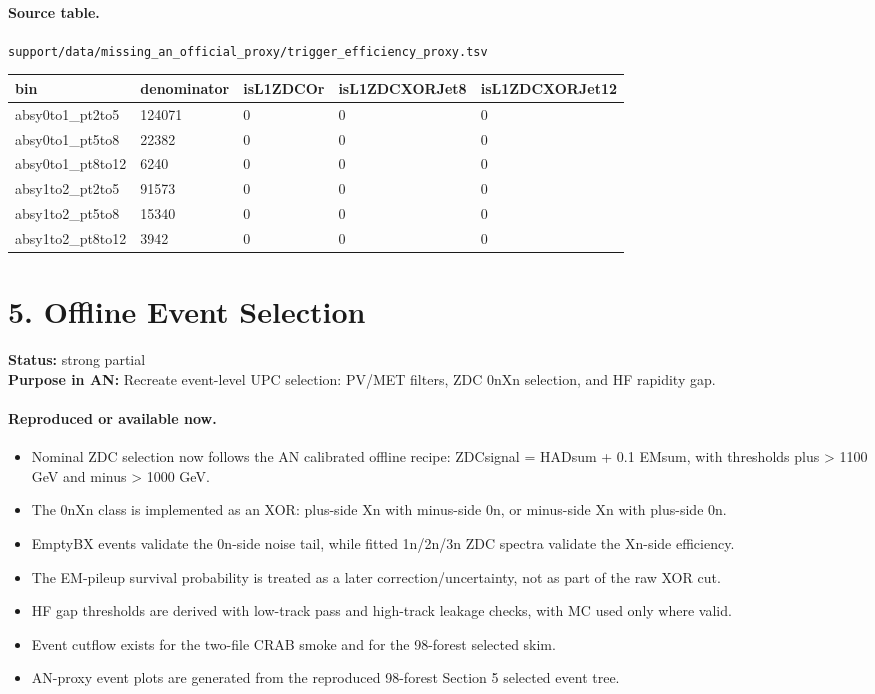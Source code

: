 \documentclass[11pt]{article}
\begin{document}
\paragraph{Source table.} \texttt{support/data/missing\_an\_official\_proxy/trigger\_efficiency\_proxy.tsv}
\begin{center}\scriptsize
\begin{tabular}{|l|l|l|l|l|}
\hline
bin & denominator & isL1ZDCOr & isL1ZDCXORJet8 & isL1ZDCXORJet12 \\ \hline
absy0to1\_pt2to5 & 124071 & 0 & 0 & 0 \\ \hline
absy0to1\_pt5to8 & 22382 & 0 & 0 & 0 \\ \hline
absy0to1\_pt8to12 & 6240 & 0 & 0 & 0 \\ \hline
absy1to2\_pt2to5 & 91573 & 0 & 0 & 0 \\ \hline
absy1to2\_pt5to8 & 15340 & 0 & 0 & 0 \\ \hline
absy1to2\_pt8to12 & 3942 & 0 & 0 & 0 \\ \hline
\end{tabular}
\end{center}
\section*{5. Offline Event Selection}
\textbf{Status:} strong partial\\
\textbf{Purpose in AN:} Recreate event-level UPC selection: PV/MET filters, ZDC 0nXn selection, and HF rapidity gap.
\paragraph{Reproduced or available now.}
\begin{itemize}
\item Nominal ZDC selection now follows the AN calibrated offline recipe: ZDCsignal = HADsum + 0.1 EMsum, with thresholds plus > 1100 GeV and minus > 1000 GeV.
\item The 0nXn class is implemented as an XOR: plus-side Xn with minus-side 0n, or minus-side Xn with plus-side 0n.
\item EmptyBX events validate the 0n-side noise tail, while fitted 1n/2n/3n ZDC spectra validate the Xn-side efficiency.
\item The EM-pileup survival probability is treated as a later correction/uncertainty, not as part of the raw XOR cut.
\item HF gap thresholds are derived with low-track pass and high-track leakage checks, with MC used only where valid.
\item Event cutflow exists for the two-file CRAB smoke and for the 98-forest selected skim.
\item AN-proxy event plots are generated from the reproduced 98-forest Section 5 selected event tree.
\end{itemize}
\end{document}
